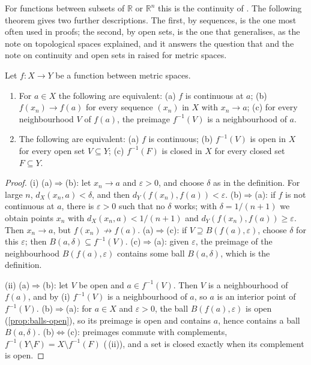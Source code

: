 For functions between subsets of $\mathbb R$ or $\mathbb R^n$ this is the continuity of . The following theorem gives two further descriptions. The first, by sequences, is the one most often used in proofs; the second, by open sets, is the one that generalises, as the note on topological spaces explained, and it answers the question that  and the note on continuity and open sets in  raised for metric spaces.

\begin{theorem}
\label{thm:continuity-characterisations}
Let $f\colon X\to Y$ be a function between metric spaces.
\begin{enumerate}
\item For $a\in X$ the following are equivalent: (a) $f$ is continuous at $a$; (b) $f(x_n)\to f(a)$ for every sequence $(x_n)$ in $X$ with $x_n\to a$; (c) for every neighbourhood $V$ of $f(a)$, the preimage $f^{-1}(V)$ is a neighbourhood of $a$.
\item The following are equivalent: (a) $f$ is continuous; (b) $f^{-1}(V)$ is open in $X$ for every open set $V\subseteq Y$; (c) $f^{-1}(F)$ is closed in $X$ for every closed set $F\subseteq Y$.
\end{enumerate}
\end{theorem}

\begin{proof}
(i) (a)$\Rightarrow$(b): let $x_n\to a$ and $\varepsilon>0$, and choose $\delta$ as in the definition. For large $n$, $d_X(x_n,a)<\delta$, and then $d_Y(f(x_n),f(a))<\varepsilon$. (b)$\Rightarrow$(a): if $f$ is not continuous at $a$, there is $\varepsilon>0$ such that no $\delta$ works; with $\delta=1/(n+1)$ we obtain points $x_n$ with $d_X(x_n,a)<1/(n+1)$ and $d_Y(f(x_n),f(a))\ge\varepsilon$. Then $x_n\to a$, but $f(x_n)\not\to f(a)$. (a)$\Rightarrow$(c): if $V\supseteq B(f(a),\varepsilon)$, choose $\delta$ for this $\varepsilon$; then $B(a,\delta)\subseteq f^{-1}(V)$. (c)$\Rightarrow$(a): given $\varepsilon$, the preimage of the neighbourhood $B(f(a),\varepsilon)$ contains some ball $B(a,\delta)$, which is the definition.

(ii) (a)$\Rightarrow$(b): let $V$ be open and $a\in f^{-1}(V)$. Then $V$ is a neighbourhood of $f(a)$, and by (i) $f^{-1}(V)$ is a neighbourhood of $a$, so $a$ is an interior point of $f^{-1}(V)$. (b)$\Rightarrow$(a): for $a\in X$ and $\varepsilon>0$, the ball $B(f(a),\varepsilon)$ is open (\cref{prop:balls-open}), so its preimage is open and contains $a$, hence contains a ball $B(a,\delta)$. (b)$\Leftrightarrow$(c): preimages commute with complements, $f^{-1}(Y\setminus F)=X\setminus f^{-1}(F)$ (\,(ii)), and a set is closed exactly when its complement is open.
\end{proof}

